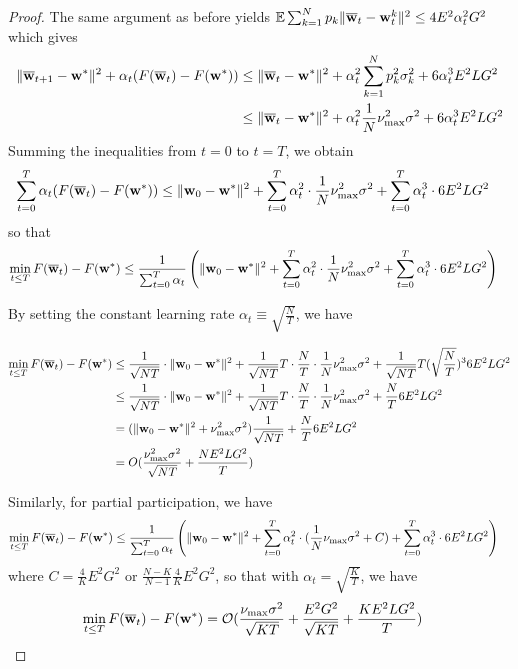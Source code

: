 \begin{proof}
	The same argument as before yields $\mathbb{E}\sum_{k=1}^{N}p_{k}\|{\overline{\mathbf{w}}}_{t}-{\mathbf{w}}_{t}^{k}\|^{2}\leq4E^{2}\alpha_{t}^{2}G^{2}$
	which gives 
	\begin{align*}
	\|{\overline{\mathbf{w}}}_{t+1}-{\mathbf{w}}^{\ast}\|^{2}+\alpha_{t}(F({\overline{\mathbf{w}}}_{t})-F({\mathbf{w}}^{\ast})) & \leq\|{\overline{\mathbf{w}}}_{t}-{\mathbf{w}}^{\ast}\|^{2}+\alpha_{t}^{2}\sum_{k=1}^{N}p_{k}^{2}\sigma_{k}^{2}+6\alpha_{t}^{3}E^{2}LG^{2}\\
	& \leq\|{\overline{\mathbf{w}}}_{t}-{\mathbf{w}}^{\ast}\|^{2}+\alpha_{t}^{2}\frac{1}{N}\nu_{\max}^{2}\sigma^{2}+6\alpha_{t}^{3}E^{2}LG^{2}
	\end{align*}
	Summing the inequalities from $t=0$ to $t=T$, we obtain 
	\begin{align*}
	\sum_{t=0}^{T}\alpha_{t}(F({\overline{\mathbf{w}}}_{t})-F({\mathbf{w}}^{\ast})) & \leq\|{\mathbf{w}}_{0}-{\mathbf{w}}^{\ast}\|^{2}+\sum_{t=0}^{T}\alpha_{t}^{2}\cdot\frac{1}{N}\nu_{\max}^{2}\sigma^{2}+\sum_{t=0}^{T}\alpha_{t}^{3}\cdot6E^{2}LG^{2}
	\end{align*}
	so that
	\begin{align*}
	\min_{t\leq T}F({\overline{\mathbf{w}}}_{t})-F({\mathbf{w}}^{\ast}) & \leq\frac{1}{\sum_{t=0}^{T}\alpha_{t}}\left(\|{\mathbf{w}}_{0}-{\mathbf{w}}^{\ast}\|^{2}+\sum_{t=0}^{T}\alpha_{t}^{2}\cdot\frac{1}{N}\nu_{\max}^{2}\sigma^{2}+\sum_{t=0}^{T}\alpha_{t}^{3}\cdot6E^{2}LG^{2}\right)
	\end{align*}
	
	By setting the constant learning rate $\alpha_{t}\equiv\sqrt{\frac{N}{T}}$,
	we have 
	
\begin{align*}
\min_{t\leq T}F({\overline{\mathbf{w}}}_{t})-F({\mathbf{w}}^{\ast}) & \leq\frac{1}{\sqrt{NT}}\cdot\|{\mathbf{w}}_{0}-{\mathbf{w}}^{\ast}\|^{2}+\frac{1}{\sqrt{NT}}T\cdot\frac{N}{T}\cdot\frac{1}{N}\nu_{\max}^{2}\sigma^{2}+\frac{1}{\sqrt{NT}}T(\sqrt{\frac{N}{T}})^{3}6E^{2}LG^{2}\\
& \leq\frac{1}{\sqrt{NT}}\cdot\|{\mathbf{w}}_{0}-{\mathbf{w}}^{\ast}\|^{2}+\frac{1}{\sqrt{NT}}T\cdot\frac{N}{T}\cdot\frac{1}{N}\nu_{\max}^{2}\sigma^{2}+\frac{N}{T}6E^{2}LG^{2}\\
& =(\|{\mathbf{w}}_{0}-{\mathbf{w}}^{\ast}\|^{2}+\nu_{\max}^{2}\sigma^{2})\frac{1}{\sqrt{NT}}+\frac{N}{T}6E^{2}LG^{2}\\
& =O(\frac{\nu_{\max}^{2}\sigma^{2}}{\sqrt{NT}}+\frac{NE^{2}LG^{2}}{T})
\end{align*}
	
	Similarly, for partial participation, we have 
	\begin{align*}
	\min_{t\leq T}F({\overline{\mathbf{w}}}_{t})-F({\mathbf{w}}^{\ast}) & \leq\frac{1}{\sum_{t=0}^{T}\alpha_{t}}\left(\|{\mathbf{w}}_{0}-{\mathbf{w}}^{\ast}\|^{2}+\sum_{t=0}^{T}\alpha_{t}^{2}\cdot(\frac{1}{N}\nu_{\max}\sigma^{2}+C)+\sum_{t=0}^{T}\alpha_{t}^{3}\cdot6E^{2}LG^{2}\right)
	\end{align*}
	where $C=\frac{4}{K}E^{2}G^{2}$ or $\frac{N-K}{N-1}\frac{4}{K}E^{2}G^{2}$,
	so that with $\alpha_{t}=\sqrt{\frac{K}{T}}$, we have 
	\begin{align*}
	\min_{t\leq T}F({\overline{\mathbf{w}}}_{t})-F({\mathbf{w}}^{\ast}) & =\mathcal{O}(\frac{\nu_{\max}\sigma^{2}}{\sqrt{KT}}+\frac{E^{2}G^{2}}{\sqrt{KT}}+\frac{KE^{2}LG^{2}}{T})
	\end{align*}
\end{proof}
